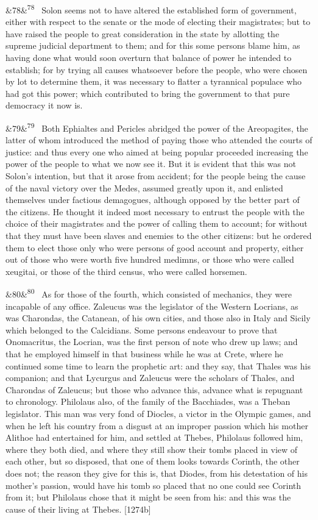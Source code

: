 \documentclass[12pt]{article}
\newcommand{\para}[1][]{\par\noindent\ifx&#1&\else\textsuperscript{\footnotesize #1}~\fi}
\begin{document}
\para[78] Solon seems not to have altered the established form of government, either with respect to the senate or the mode of electing their magistrates; but to have raised the people to great consideration in the state by allotting the supreme judicial department to them; and for this some persons blame him, as having done what would soon overturn that balance of power he intended to establish; for by trying all causes whatsoever before the people, who were chosen by lot to determine them, it was necessary to flatter a tyrannical populace who had got this power; which contributed to bring the government to that pure democracy it now is.

\para[79] Both Ephialtes and Pericles abridged the power of the Areopagites, the latter of whom introduced the method of paying those who attended the courts of justice: and thus every one who aimed at being popular proceeded increasing the power of the people to what we now see it. But it is evident that this was not Solon's intention, but that it arose from accident; for the people being the cause of the naval victory over the Medes, assumed greatly upon it, and enlisted themselves under factious demagogues, although opposed by the better part of the citizens. He thought it indeed most necessary to entrust the people with the choice of their magistrates and the power of calling them to account; for without that they must have been slaves and enemies to the other citizens: but he ordered them to elect those only who were persons of good account and property, either out of those who were worth five hundred medimns, or those who were called xeugitai, or those of the third census, who were called horsemen.

\para[80] As for those of the fourth, which consisted of mechanics, they were incapable of any office. Zaleucus was the legislator of the Western Locrians, as was Charondas, the Catanean, of his own cities, and those also in Italy and Sicily which belonged to the Calcidians. Some persons endeavour to prove that Onomacritus, the Locrian, was the first person of note who drew up laws; and that he employed himself in that business while he was at Crete, where he continued some time to learn the prophetic art: and they say, that Thales was his companion; and that Lycurgus and Zaleucus were the scholars of Thales, and Charondas of Zaleucus; but those who advance this, advance what is repugnant to chronology. Philolaus also, of the family of the Bacchiades, was a Theban legislator. This man was very fond of Diocles, a victor in the Olympic games, and when he left his country from a disgust at an improper passion which his mother Alithoe had entertained for him, and settled at Thebes, Philolaus followed him, where they both died, and where they still show their tombs placed in view of each other, but so disposed, that one of them looks towards Corinth, the other does not; the reason they give for this is, that Diodes, from his detestation of his mother's passion, would have his tomb so placed that no one could see Corinth from it; but Philolaus chose that it might be seen from his: and this was the cause of their living at Thebes. [1274b]
\end{document}
